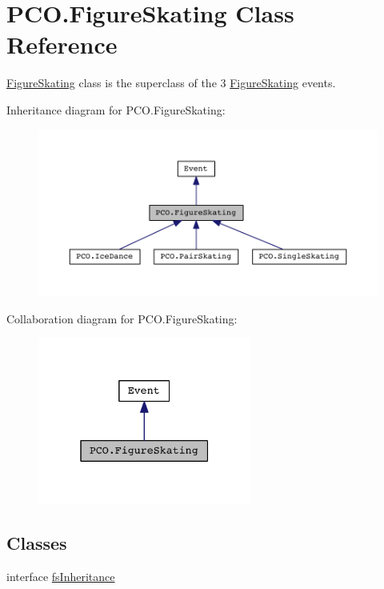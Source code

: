 \hypertarget{classPCO_1_1FigureSkating}{\section{P\+C\+O.\+Figure\+Skating Class Reference}
\label{classPCO_1_1FigureSkating}
}


\hyperlink{classPCO_1_1FigureSkating}{Figure\+Skating} class is the superclass of the 3 \hyperlink{classPCO_1_1FigureSkating}{Figure\+Skating} events.  




Inheritance diagram for P\+C\+O.\+Figure\+Skating\+:\nopagebreak
\begin{figure}[H]
\begin{center}
\leavevmode
\includegraphics[width=350pt]{classPCO_1_1FigureSkating__inherit__graph}
\end{center}
\end{figure}


Collaboration diagram for P\+C\+O.\+Figure\+Skating\+:\nopagebreak
\begin{figure}[H]
\begin{center}
\leavevmode
\includegraphics[width=199pt]{classPCO_1_1FigureSkating__coll__graph}
\end{center}
\end{figure}
\subsection*{Classes}
\begin{DoxyCompactItemize}
\item 
interface \hyperlink{interfacePCO_1_1FigureSkating_1_1fsInheritance}{fs\+Inheritance}
\end{DoxyCompactItemize}

